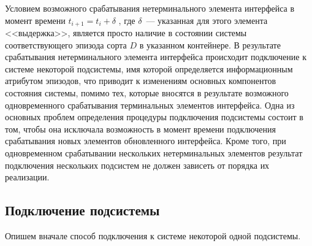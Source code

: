 Условием возможного срабатывания нетерминального элемента интерфейса в момент времени $ t_{i+1} = t_i + \delta $ , где $ \delta $~--- указанная для этого элемента <<выдержка>>, является просто наличие в состоянии системы соответствующего эпизода сорта $ D $ в указанном контейнере. 
В результате срабатывания нетерминального элемента интерфейса происходит подключение к системе некоторой подсистемы, имя которой определяется информационным атрибутом эпизодов, что приводит к изменениям основных компонентов состояния системы, помимо тех, которые вносятся в результате возможного одновременного срабатывания терминальных элементов интерфейса. 
Одна из основных проблем определения процедуры подключения подсистемы состоит в том, чтобы она исключала возможность в момент времени подключения срабатывания новых элементов обновленного интерфейса. 
Кроме того, при одновременном срабатывании нескольких нетерминальных элементов результат подключения нескольких подсистем не должен зависеть от порядка их реализации.

\subsection{Подключение подсистемы}
Опишем вначале способ подключения к системе некоторой одной подсистемы.

